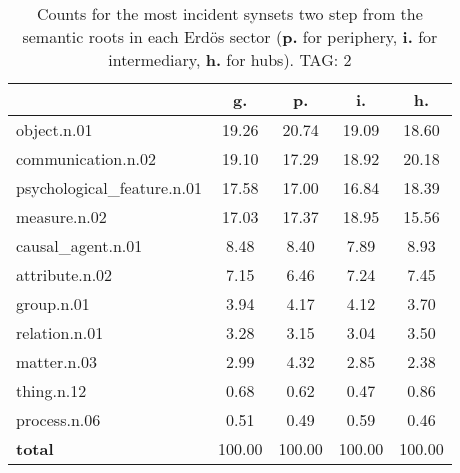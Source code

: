 \begin{table}[h!]
\begin{center}
\begin{tabular}{| l || c | c | c | c |}\hline
 & {\bf g.} & {\bf p.} & {\bf i.} & {\bf h.} \\\hline\hline
object.n.01 & 19.26  & 20.74  & 19.09  & 18.60 \\\hline
communication.n.02 & 19.10  & 17.29  & 18.92  & 20.18 \\\hline
psychological\_feature.n.01 & 17.58  & 17.00  & 16.84  & 18.39 \\\hline
measure.n.02 & 17.03  & 17.37  & 18.95  & 15.56 \\\hline
causal\_agent.n.01 & 8.48  & 8.40  & 7.89  & 8.93 \\\hline
attribute.n.02 & 7.15  & 6.46  & 7.24  & 7.45 \\\hline
group.n.01 & 3.94  & 4.17  & 4.12  & 3.70 \\\hline
relation.n.01 & 3.28  & 3.15  & 3.04  & 3.50 \\\hline
matter.n.03 & 2.99  & 4.32  & 2.85  & 2.38 \\\hline
thing.n.12 & 0.68  & 0.62  & 0.47  & 0.86 \\\hline
process.n.06 & 0.51  & 0.49  & 0.59  & 0.46 \\\hline\hline
{{\bf total}} & 100.00  & 100.00  & 100.00  & 100.00 \\\hline
\end{tabular}
\caption{Counts for the most incident synsets two step from the semantic roots in each Erd\"os sector ({\bf p.} for periphery, {\bf i.} for intermediary, {\bf h.} for hubs). TAG: 2}
\end{center}
\end{table}
